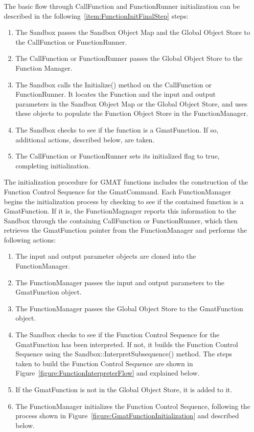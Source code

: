 The basic flow through CallFunction and FunctionRunner initialization can be described in the
following~\ref{item:FunctionInitFinalStep} steps:

\begin{enumerate}
\item The Sandbox passes the Sandbox Object Map and the Global Object Store to the CallFunction
or FunctionRunner.
\item The CallFunction or FunctionRunner passes the Global Object Store to the Function Manager.
\item The Sandbox calls the Initialize() method on the CallFunction or FunctionRunner.  It locates
the Function and the input and output parameters in the Sandbox Object Map or the Global Object
Store, and uses these objects to populate the Function Object Store in the FunctionManager.
\item The Sandbox checks to see if the function is a GmatFunction.  If so, additional actions,
described below, are taken.
\item \label{item:FunctionInitFinalStep}The CallFunction or FunctionRunner sets its initialized flag
to true, completing initialization.
\end{enumerate}

The initialization procedure for GMAT functions includes the construction of the Function Control
Sequence for the GmatCommand.  Each FunctionManager begins the initialization process by checking to
see if the contained function is a GmatFunction. If it is, the FunctionMagnager reports this
information to the Sandbox through the containing CallFunction or FunctionRunner, which then
retrieves the GmatFunction pointer from the FunctionManager and performs the following actions:

\begin{enumerate}
\item The input and output parameter objects are cloned into the FunctionManager.
\item The FunctionManager passes the input and output parameters to the GmatFunction object.
\item The FunctionManager passes the Global Object Store to the GmatFunction object.
\item The Sandbox checks to see if the Function Control Sequence for the GmatFunction has been
interpreted.  If not, it builds the Function Control Sequence using the
Sandbox::InterpretSubsequence() method.  The steps taken to build the Function Control Sequence are
shown in Figure~\ref{figure:FunctionInterpreterFlow} and explained below.
\item If the GmatFunction is not in the Global Object Store, it is added to it.
\item The FunctionManager initializes the Function Control Sequence, following the process shown in
Figure~\ref{figure:GmatFunctionInitialization} and described below.
\end{enumerate}

